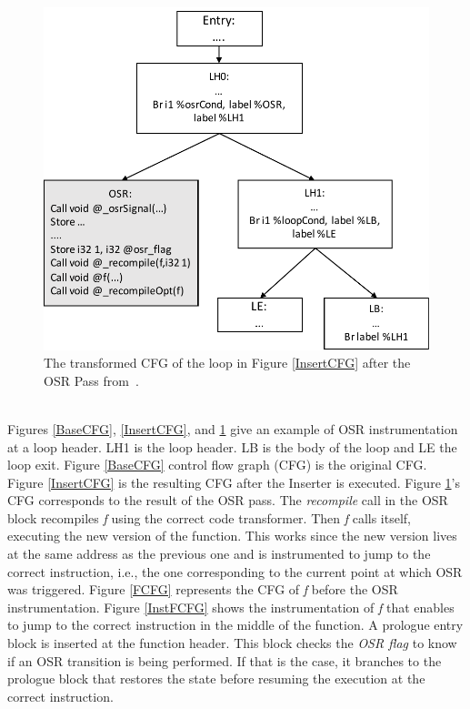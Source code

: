 \begin{figure}[h]
\centering
\includegraphics[scale=0.5]{Figures/OSRPassCFG.pdf}
\decoRule
\caption[The transformed CFG of the loop in Figure \ref{InsertCFG} after the OSR Pass]{The transformed CFG of the loop in Figure \ref{InsertCFG} after the OSR Pass from~\cite{lameed2013modular}.}
\label{OSRPassCFG}
\end{figure}\\

Figures \ref{BaseCFG}, \ref{InsertCFG}, and \ref{OSRPassCFG} give an example of OSR instrumentation at a loop header.
LH1 is the loop header. 
LB is the body of the loop and LE the loop exit. 
Figure \ref{BaseCFG} control flow graph (CFG) is the original CFG. 
Figure \ref{InsertCFG} is the resulting CFG after the Inserter is executed.
Figure \ref{OSRPassCFG}'s CFG corresponds to the result of the OSR pass.
The \textit{recompile} call in the OSR block recompiles \textit{f} using the correct code transformer.
Then \textit{f} calls itself, executing the new version of the function.
This works since the new version lives at the same address as the previous one and is instrumented to jump to the correct instruction, i.e., the one corresponding to the current point at which OSR was triggered.
Figure \ref{FCFG} represents the CFG of \textit{f} before the OSR instrumentation.
Figure \ref{InstFCFG} shows the instrumentation of \textit{f} that enables to jump to the correct instruction in the middle of the function. 
A prologue entry block is inserted at the function header.
This block checks the \textit{OSR flag} to know if an OSR transition is being performed.
If that is the case, it branches to the prologue block that restores the state before resuming the execution at the correct instruction.\\

